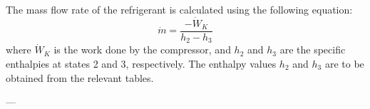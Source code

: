The mass flow rate of the refrigerant is calculated using the following equation:  
\[
\dot{m} = \frac{-\dot{W}_K}{h_2 - h_3}
\]  
where \( \dot{W}_K \) is the work done by the compressor, and \( h_2 \) and \( h_3 \) are the specific enthalpies at states 2 and 3, respectively. The enthalpy values \( h_2 \) and \( h_3 \) are to be obtained from the relevant tables.

---